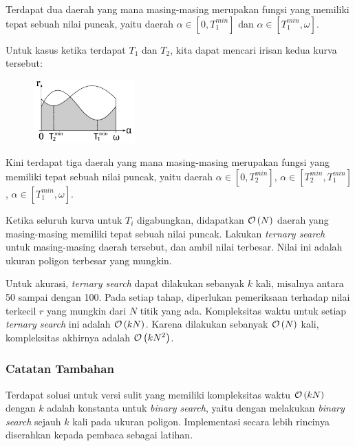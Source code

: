 \documentclass[../main_editorial.tex]{subfiles} %
\begin{document}
Terdapat dua daerah yang mana masing-masing merupakan fungsi yang memiliki tepat sebuah nilai puncak, yaitu daerah $\alpha \in [0, T_1^{min}]$ dan $\alpha \in [T_1^{min}, \omega]$.

Untuk kasus ketika terdapat $T_1$ dan $T_2$, kita dapat mencari irisan kedua kurva tersebut:

\begin{figure}[H]\centering
	\includegraphics[width=0.35\textwidth]{balon/asset/hard-chart2.pdf}
\end{figure}

Kini terdapat tiga daerah yang mana masing-masing merupakan fungsi yang memiliki tepat sebuah nilai puncak, yaitu daerah $\alpha \in [0, T_2^{min}]$, $\alpha \in [T_2^{min}, T_1^{min}]$, $\alpha \in [T_1^{min}, \omega]$.

Ketika seluruh kurva untuk $T_i$ digabungkan, didapatkan $\mathcal{O}\left( N \right)$ daerah yang masing-masing memiliki tepat sebuah nilai puncak. Lakukan \textit{ternary search} untuk masing-masing daerah tersebut, dan ambil nilai terbesar. Nilai ini adalah ukuran poligon terbesar yang mungkin.

Untuk akurasi, \textit{ternary search} dapat dilakukan sebanyak $k$ kali, misalnya antara 50 sampai dengan 100. Pada setiap tahap, diperlukan pemeriksaan terhadap nilai terkecil $r$ yang mungkin dari $N$ titik yang ada. Kompleksitas waktu untuk setiap \textit{ternary search} ini adalah $\mathcal{O}\left( kN \right)$. Karena dilakukan sebanyak $\mathcal{O}\left( N \right)$ kali, kompleksitas akhirnya adalah  $\mathcal{O}\left( kN^2 \right)$.


\subsubsection*{Catatan Tambahan}

Terdapat solusi untuk versi sulit yang memiliki kompleksitas waktu $\mathcal{O}\left( kN \right)$ dengan $ k $ adalah konstanta untuk \textit{binary search}, yaitu dengan melakukan \textit{binary search} sejauh $ k $ kali pada ukuran poligon. Implementasi secara lebih rincinya diserahkan kepada pembaca sebagai latihan. 
\end{document}
